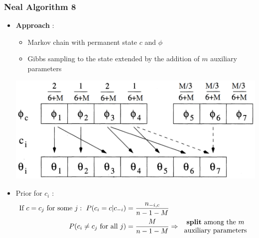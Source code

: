 \begin{frame} %
	\frametitle{Neal Algorithm 8}
	\begin{itemize}
		\item \textbf{Approach} :
		\begin{itemize}
		    \item Markov chain with permanent state $c$ and $\phi$ %
		    \item Gibbs sampling to the state extended by the addition of $m$ auxiliary parameters \\
        \end{itemize}
        \begin{center}
        	\includegraphics[scale=0.29]{etc/neal8.png}
        \end{center}

        \item Prior for $c_{i}$ :
            \begin{align*}
                \text{If} \ c=c_{j} \ \text{for some } j: \ P(c_{i}=c | c_{-i}) &= \frac{n_{-i,c}}{n-1-M}  \\
                P(c_{i}\neq c_{j} \text{ for all } j) &=\frac{M }{n-1-M}  \Rightarrow 
                \begin{tabular}{c}
                \textbf{split} among the $m$ \\
                auxiliary parameters 
                \end{tabular}
            \end{align*}	
	\end{itemize}
\end{frame}




